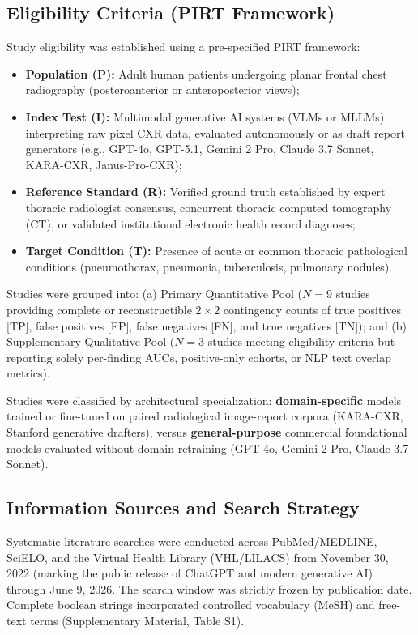 \documentclass[preprint,11pt]{elsarticle}
\begin{document}
\subsection{Eligibility Criteria (PIRT Framework)}
Study eligibility was established using a pre-specified PIRT framework:
\begin{itemize}
    \item \textbf{Population (P):} Adult human patients undergoing planar frontal chest radiography (posteroanterior or anteroposterior views);
    \item \textbf{Index Test (I):} Multimodal generative AI systems (VLMs or MLLMs) interpreting raw pixel CXR data, evaluated autonomously or as draft report generators (e.g., GPT-4o, GPT-5.1, Gemini 2 Pro, Claude 3.7 Sonnet, KARA-CXR, Janus-Pro-CXR);
    \item \textbf{Reference Standard (R):} Verified ground truth established by expert thoracic radiologist consensus, concurrent thoracic computed tomography (CT), or validated institutional electronic health record diagnoses;
    \item \textbf{Target Condition (T):} Presence of acute or common thoracic pathological conditions (pneumothorax, pneumonia, tuberculosis, pulmonary nodules).
\end{itemize}

Studies were grouped into: (a) Primary Quantitative Pool ($N=9$ studies providing complete or reconstructible $2\times 2$ contingency counts of true positives [TP], false positives [FP], false negatives [FN], and true negatives [TN]); and (b) Supplementary Qualitative Pool ($N=3$ studies meeting eligibility criteria but reporting solely per-finding AUCs, positive-only cohorts, or NLP text overlap metrics).

Studies were classified by architectural specialization: \textbf{domain-specific} models trained or fine-tuned on paired radiological image-report corpora (KARA-CXR, Stanford generative drafters), versus \textbf{general-purpose} commercial foundational models evaluated without domain retraining (GPT-4o, Gemini 2 Pro, Claude 3.7 Sonnet).

\subsection{Information Sources and Search Strategy}
Systematic literature searches were conducted across PubMed/MEDLINE, SciELO, and the Virtual Health Library (VHL/LILACS) from November 30, 2022 (marking the public release of ChatGPT and modern generative AI) through June 9, 2026. The search window was strictly frozen by publication date. Complete boolean strings incorporated controlled vocabulary (MeSH) and free-text terms (Supplementary Material, Table S1). 
\end{document}
